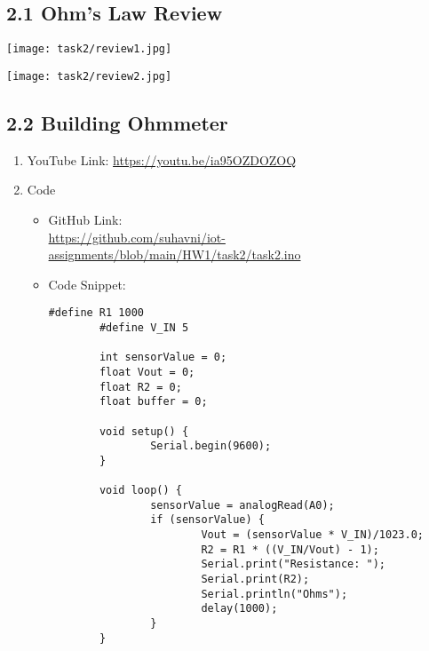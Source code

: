 \documentclass[12pt]{article}
\begin{document}
\subsection*{2.1 Ohm's Law Review}
\texttt{[image: task2/review1.jpg]}

\newpage
\texttt{[image: task2/review2.jpg]}
\newpage

\subsection*{2.2 Building Ohmmeter}

\begin{enumerate}
	\item YouTube Link: \href{https://youtu.be/ia95OZDOZOQ}{https://youtu.be/ia95OZDOZOQ}
	\item Code
		\begin{itemize}
			\item GitHub Link:\\ 
				\href{https://github.com/suhavni/iot-assignments/blob/main/HW1/task2/task2.ino}{https://github.com/suhavni/iot-assignments/blob/main/HW1/task2/task2.ino}
			\item Code Snippet:
				\begin{lstlisting}[language=Arduino]
		#define R1 1000
		#define V_IN 5
		
		int sensorValue = 0;
		float Vout = 0;
		float R2 = 0;
		float buffer = 0;
		
		void setup() {
				Serial.begin(9600);
		}
		
		void loop() {
				sensorValue = analogRead(A0);
				if (sensorValue) {
						Vout = (sensorValue * V_IN)/1023.0;
						R2 = R1 * ((V_IN/Vout) - 1);
						Serial.print("Resistance: ");
						Serial.print(R2);
						Serial.println("Ohms");
						delay(1000);
				}
		}
				\end{lstlisting}
	\end{itemize}
\end{enumerate}

\newpage
\end{document}
